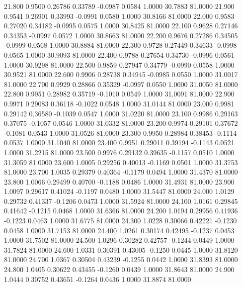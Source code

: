   21.800   0.9500   0.26786   0.33789  -0.0987   0.0584   1.0000  30.7883  81.0000
  21.900   0.9541   0.26901   0.33993  -0.0991   0.0580   1.0000  30.8166  81.0000
  22.000   0.9583   0.27020   0.34182  -0.0995   0.0575   1.0000  30.8425  81.0000
  22.100   0.9628   0.27146   0.34353  -0.0997   0.0572   1.0000  30.8663  81.0000
  22.200   0.9676   0.27286   0.34505  -0.0999   0.0568   1.0000  30.8884  81.0000
  22.300   0.9728   0.27449   0.34633  -0.0998   0.0565   1.0000  30.9093  81.0000
  22.400   0.9788   0.27654   0.34730  -0.0996   0.0561   1.0000  30.9298  81.0000
  22.500   0.9859   0.27947   0.34779  -0.0990   0.0558   1.0000  30.9521  81.0000
  22.600   0.9906   0.28738   0.34945  -0.0985   0.0550   1.0000  31.0017  81.0000
  22.700   0.9929   0.28866   0.35329  -0.0997   0.0550   1.0000  31.0050  81.0000
  22.800   0.9951   0.28982   0.35719  -0.1010   0.0549   1.0000  31.0091  81.0000
  22.900   0.9971   0.29083   0.36118  -0.1022   0.0548   1.0000  31.0144  81.0000
  23.000   0.9981   0.29142   0.36580  -0.1039   0.0547   1.0000  31.0220  81.0000
  23.100   0.9986   0.29163   0.37075  -0.1057   0.0546   1.0000  31.0332  81.0000
  23.200   0.9974   0.29101   0.37672  -0.1081   0.0543   1.0000  31.0526  81.0000
  23.300   0.9950   0.28984   0.38453  -0.1114   0.0537   1.0000  31.1040  81.0000
  23.400   0.9951   0.29011   0.39194  -0.1143   0.0521   1.0000  31.2215  81.0000
  23.500   0.9976   0.29132   0.39635  -0.1157   0.0510   1.0000  31.3059  81.0000
  23.600   1.0005   0.29256   0.40013  -0.1169   0.0501   1.0000  31.3753  81.0000
  23.700   1.0035   0.29379   0.40364  -0.1179   0.0494   1.0000  31.4370  81.0000
  23.800   1.0066   0.29499   0.40700  -0.1188   0.0486   1.0000  31.4931  81.0000
  23.900   1.0097   0.29617   0.41024  -0.1197   0.0480   1.0000  31.5447  81.0000
  24.000   1.0129   0.29732   0.41337  -0.1206   0.0473   1.0000  31.5924  81.0000
  24.100   1.0161   0.29845   0.41642  -0.1215   0.0468   1.0000  31.6366  81.0000
  24.200   1.0194   0.29956   0.41936  -0.1223   0.0463   1.0000  31.6775  81.0000
  24.300   1.0228   0.30066   0.42221  -0.1230   0.0458   1.0000  31.7153  81.0000
  24.400   1.0261   0.30174   0.42495  -0.1237   0.0453   1.0000  31.7502  81.0000
  24.500   1.0296   0.30282   0.42757  -0.1244   0.0449   1.0000  31.7824  81.0000
  24.600   1.0331   0.30391   0.43005  -0.1250   0.0445   1.0000  31.8120  81.0000
  24.700   1.0367   0.30504   0.43239  -0.1255   0.0442   1.0000  31.8393  81.0000
  24.800   1.0405   0.30622   0.43455  -0.1260   0.0439   1.0000  31.8643  81.0000
  24.900   1.0444   0.30752   0.43651  -0.1264   0.0436   1.0000  31.8874  81.0000
